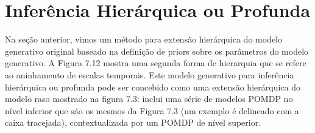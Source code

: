 \documentclass[
  12pt,
]{book}
\begin{document}
\hypertarget{inferuxeancia-hieruxe1rquica-ou-profunda}{%
\section{Inferência Hierárquica ou Profunda}\label{inferuxeancia-hieruxe1rquica-ou-profunda}}

Na seção anterior, vimos um método para extensão hierárquica do modelo generativo original baseado na definição de priors sobre os parâmetros do modelo generativo. A Figura 7.12 mostra uma segunda forma de hierarquia que se refere ao aninhamento de escalas temporais. Este modelo generativo para inferência hierárquica ou profunda pode ser concebido como uma extensão hierárquica do modelo raso mostrado na figura 7.3: inclui uma série de modelos POMDP no nível inferior que são os mesmos da Figura 7.3 (um exemplo é delineado com a caixa tracejada), contextualizada por um POMDP de nível superior.
\end{document}
